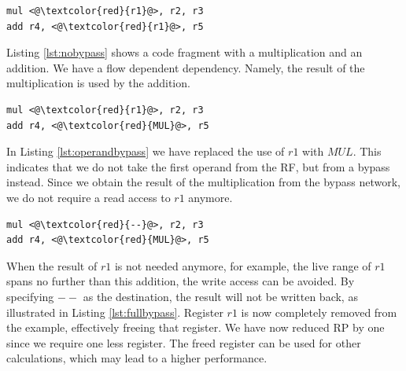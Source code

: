 


\begin{lstlisting}[caption=Example code fragment where no bypassing is specified., label=lst:nobypass]
mul <@\textcolor{red}{r1}@>, r2, r3
add r4, <@\textcolor{red}{r1}@>, r5
\end{lstlisting}

Listing \ref{lst:nobypass} shows a code fragment with a multiplication and an addition. We have a flow dependent dependency. Namely, the result of the multiplication is used by the addition.

\begin{lstlisting}[caption=Example code fragment avoiding a read access., label=lst:operandbypass]
mul <@\textcolor{red}{r1}@>, r2, r3
add r4, <@\textcolor{red}{MUL}@>, r5
\end{lstlisting}

In Listing \ref{lst:operandbypass} we have replaced the use of $r1$ with $MUL$. This indicates that we do not take the first operand from the RF, but from a bypass instead. Since we obtain the result of the multiplication from the bypass network, we do not require a read access to $r1$ anymore.

\begin{lstlisting}[caption=Example code fragment avoiding a read and a write access., label=lst:fullbypass]
mul <@\textcolor{red}{--}@>, r2, r3
add r4, <@\textcolor{red}{MUL}@>, r5
\end{lstlisting}

When the result of $r1$ is not needed anymore, for example, the live range of $r1$ spans no further than this addition, the write access can be avoided. By specifying $--$ as the destination, the result will not be written back, as illustrated in Listing \ref{lst:fullbypass}. Register $r1$ is now completely removed from the example, effectively freeing that register. We have now reduced RP by one since we require one less register. The freed register can be used for other calculations, which may lead to a higher performance.

